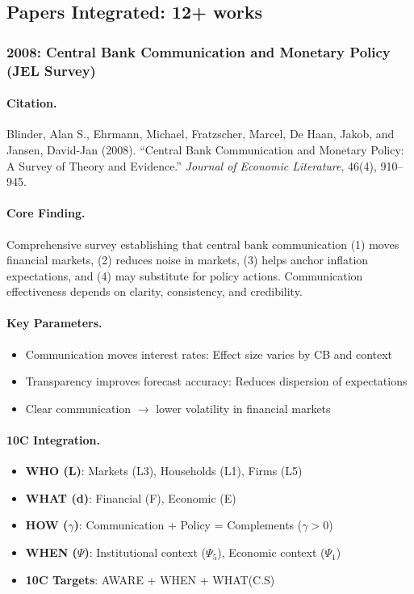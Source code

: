 \subsection{Papers Integrated: 12+ works}

\subsubsection{2008: Central Bank Communication and Monetary Policy (JEL Survey)}

\paragraph{Citation.}
Blinder, Alan S., Ehrmann, Michael, Fratzscher, Marcel, De Haan, Jakob, and Jansen, David-Jan (2008).
``Central Bank Communication and Monetary Policy: A Survey of Theory and Evidence.''
\textit{Journal of Economic Literature}, 46(4), 910--945.

\paragraph{Core Finding.}
Comprehensive survey establishing that central bank communication (1) moves financial markets,
(2) reduces noise in markets, (3) helps anchor inflation expectations, and (4) may substitute
for policy actions. Communication effectiveness depends on clarity, consistency, and credibility.

\paragraph{Key Parameters.}
\begin{itemize}[nosep]
  \item Communication moves interest rates: Effect size varies by CB and context
  \item Transparency improves forecast accuracy: Reduces dispersion of expectations
  \item Clear communication $\rightarrow$ lower volatility in financial markets
\end{itemize}

\paragraph{10C Integration.}
\begin{itemize}[nosep]
  \item \textbf{WHO (L)}: Markets (L3), Households (L1), Firms (L5)
  \item \textbf{WHAT (d)}: Financial (F), Economic (E)
  \item \textbf{HOW ($\gamma$)}: Communication + Policy = Complements ($\gamma > 0$)
  \item \textbf{WHEN ($\Psi$)}: Institutional context ($\Psi_5$), Economic context ($\Psi_1$)
  \item \textbf{10C Targets}: AWARE  + WHEN  + WHAT(C.S) \end{itemize}

